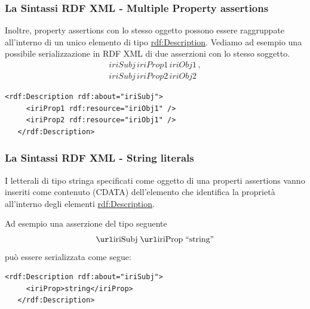 \documentclass[8pt]{beamer}
\begin{document}
\begin{frame}[fragile]
 \frametitle{La Sintassi RDF XML - Multiple Property assertions}
 
 
 Inoltre, property assertions con lo stesso oggetto possono essere 
 raggruppate all'interno di un unico elemento di tipo \url{rdf:Description}.
 Vediamo ad esempio una possibile serializzazione in RDF XML di due asserzioni 
 con lo stesso soggetto.
\[
\begin{array}{l}
 iriSubj\,iriProp1\,iriObj1 \,, \\
 iriSubj\,iriProp2\,iriObj2
\end{array}
\]

\begin{Verbatim}[fontsize=\small]
   <rdf:Description rdf:about="iriSubj">
     <iriProp1 rdf:resource="iriObj1" />
     <iriProp2 rdf:resource="iriObj1" />
   </rdf:Description>
\end{Verbatim}
\end{frame}

% 
% 
% 

\begin{frame}[fragile]
 \frametitle{La Sintassi RDF XML - String literals}
I letterali di tipo stringa specificati come oggetto di una 
properti assertions vanno inseriti come contenuto (CDATA) dell'elemento
che identifica la propriet\`a all'interno degli elementi \url{rdf:Description}.

Ad esempio una asserzione del tipo seguente
\[
 \triple{iriSubj}{iriProp}{\stringLiteral{string}}
\]
pu\`o essere serializzata come segue:
\vspace{\baselineskip}

\begin{Verbatim}[fontsize=\small]
   <rdf:Description rdf:about="iriSubj">
     <iriProp>string</iriProp>
   </rdf:Description>
\end{Verbatim}
\end{frame}
\end{document}
